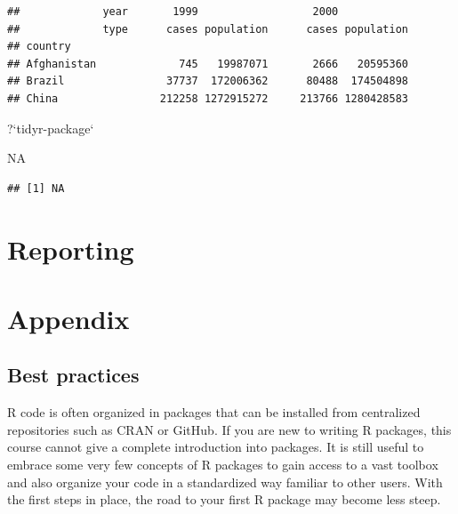 \documentclass[]{book}
\newenvironment{Shaded}{}{}
\newcommand{\DataTypeTok}[1]{#1}
\newcommand{\NormalTok}[1]{#1}
\newcommand{\OtherTok}[1]{\textcolor[rgb]{1.00,0.25,0.00}{#1}}
\newcommand{\StringTok}[1]{\textcolor[rgb]{0.00,0.50,0.50}{#1}}
\begin{document}
\begin{verbatim}
##             year       1999                  2000           
##             type      cases population      cases population
## country                                                     
## Afghanistan             745   19987071       2666   20595360
## Brazil                37737  172006362      80488  174504898
## China                212258 1272915272     213766 1280428583
\end{verbatim}

\begin{Shaded}
\begin{Highlighting}[]
\NormalTok{?}\StringTok{`}\DataTypeTok{tidyr-package}\StringTok{`}
\end{Highlighting}
\end{Shaded}

\begin{Shaded}
\begin{Highlighting}[]
\OtherTok{NA}
\end{Highlighting}
\end{Shaded}

\begin{verbatim}
## [1] NA
\end{verbatim}

\hypertarget{part-reporting}{%
\part{Reporting}\label{part-reporting}}

\hypertarget{part-appendix}{%
\part{Appendix}\label{part-appendix}}

\hypertarget{best-practices}{%
\chapter{Best practices}\label{best-practices}}

R code is often organized in packages that can be installed from centralized repositories such as CRAN or GitHub.
If you are new to writing R packages, this course cannot give a complete introduction into packages.
It is still useful to embrace some very few concepts of R packages to gain access to a vast toolbox and also organize your code in a standardized way familiar to other users.
With the first steps in place, the road to your first R package may become less steep.
\end{document}

